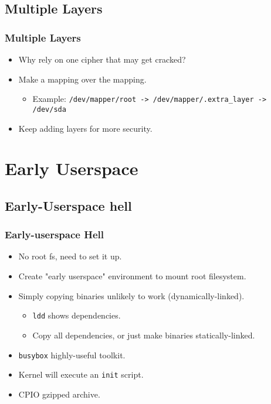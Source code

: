 \documentclass[xcolor={dvipsnames,svgnames},hyperref=dvips]{beamer}
\begin{document}
	\subsection{Multiple Layers}
	\begin{frame}
		\frametitle{Multiple Layers}
		\begin{itemize}
		\item Why rely on one cipher that may get cracked?
		\item Make a mapping over the mapping.
			\begin{itemize}
			\item Example: \texttt{/dev/mapper/root -> /dev/mapper/.extra\_layer -> /dev/sda}
			\end{itemize}
		\item Keep adding layers for more security.
		\end{itemize}
	\end{frame}

\section{Early Userspace}\label{section:hell}
	\subsection{Early-Userspace hell}
	\begin{frame}
		\frametitle{Early-userspace Hell}
		\begin{itemize}
		\item No root fs, need to set it up.
		\item Create "early userspace" environment to mount root filesystem.
		\item Simply copying binaries unlikely to work (dynamically-linked).
			\begin{itemize}
			\item \texttt{ldd} shows dependencies.
			\item Copy all dependencies, or just make binaries statically-linked.
			\end{itemize}
		\item \texttt{busybox} highly-useful toolkit.
		\item Kernel will execute an \texttt{init} script.
		\item CPIO gzipped archive.
		\end{itemize}
	\end{frame}

\begin{frame}
\end{frame}
\end{document}

